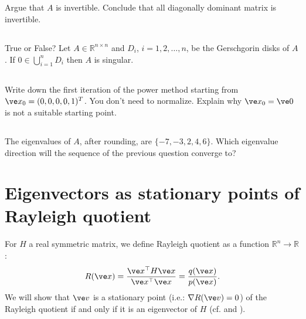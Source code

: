 \documentclass[11pt,letterpaper]{article}
\begin{document}
\subsection{}
Argue that $A$ is invertible. Conclude that all diagonally dominant matrix is invertible.

\subsection{}
True or False? Let $A \in \mathbb{R}^{n \times n}$ and $D_i$, $i
  = 1,2,\dots,n$, be the Gerschgorin disks of $A$. If $0 \in
  \bigcup_{i=1}^n D_i$ then $A$ is singular.
  
\subsection{}
Write down the first iteration of the power method starting from $\ve x_0 = (0,0,0,0,1)^T$.
You don't need to normalize.
Explain why $\ve x_0 = \ve 0$ is not a suitable starting point.

\subsection{}
The eigenvalues of $A$, after rounding, are $\{-7, -3, 2, 4, 6\}$.
Which eigenvalue direction will the sequence of the previous question converge to?

\section{Eigenvectors as stationary points of Rayleigh quotient}

For $H$ a real symmetric matrix, we define Rayleigh quotient as a function $\mathbb{R}^n\to\mathbb{R}$:
\begin{align*}
    R(\ve x) = \frac{\ve x^\top H\ve x}{\ve x^\top \ve x} = \frac{q(\ve x)}{p(\ve x)}.
\end{align*}
We will show that $\ve v$ is a stationary point (i.e.: $\nabla R(\ve v) = 0$) of the Rayleigh quotient if and only if it is an eigenvector of $H$ (cf. \cite[p.114-116]{Lax_07} and \cite[p.203-204]{TrefethenBau_97}).
\end{document}
